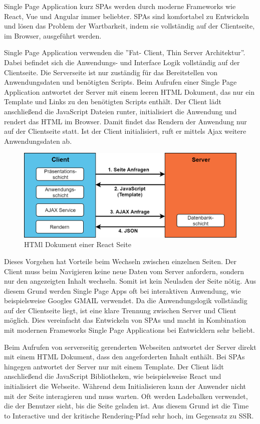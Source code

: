 \documentclass[runningheads]{llncs}
\begin{document}
Single Page Application kurz SPAs werden durch moderne Frameworks wie React, 
Vue und Angular immer beliebter. SPAs sind komfortabel zu Entwickeln 
und lösen das Problem der Wartbarkeit, 
indem sie vollständig auf der Clientseite, 
im Browser, ausgeführt werden.

Single Page Application verwenden die ”Fat- Client, Thin Server Architektur”. 
Dabei befindet sich die Anwendungs- und Interface Logik vollständig auf der Clientseite. 
Die Serverseite ist nur zuständig für das Bereitstellen von Anwendungsdaten 
und benötigten Scripts. 
Beim Aufrufen einer Single Page Application antwortet der Server 
mit einem leeren HTML Dokument, das nur ein Template und Links 
zu den benötigten Scripts enthält. 
Der Client lädt anschließend die JavaScript Dateien runter, 
initialisiert die Anwendung und rendert das HTML im Browser. 
Damit findet das Rendern der Anwendung nur auf der Clientseite statt. 
Ist der Client initialisiert, ruft er mittels Ajax weitere Anwendungsdaten ab.

\begin{figure}[h]
  \centering
  \includegraphics[width=12cm]{images/client}
  \caption{HTMl Dokument einer React Seite}
\end{figure}

Dieses Vorgehen hat Vorteile beim Wechseln zwischen einzelnen Seiten. 
Der Client muss beim Navigieren keine neue Daten vom Server anfordern, 
sondern nur den angezeigten Inhalt wechseln. 
Somit ist kein Neuladen der Seite nötig. 
Aus diesem Grund werden Single Page Apps oft bei interaktiven Anwendung, 
wie beispielsweise Googles GMAIL verwendet. 
Da die Anwendungslogik vollständig auf der Clientseite liegt, 
ist eine klare Trennung zwischen Server und Client möglich. 
Dies vereinfacht das Entwickeln von SPAs und
macht in Kombination mit modernen Frameworks 
Single Page Applications bei Entwicklern sehr beliebt.

Beim Aufrufen von serverseitig gerenderten Webseiten antwortet
der Server direkt mit einem HTML Dokument, 
dass den angeforderten Inhalt enthält. 
Bei SPAs hingegen antwortet der Server nur mit einem Template. 
Der Client lädt anschließend die JavaScript Bibliotheken, 
wie beispielsweise React und initialisiert die Webseite. 
Während dem Initialisieren kann der Anwender nicht mit der Seite interagieren
und muss warten. Oft werden Ladebalken verwendet, 
die der Benutzer sieht, bis die Seite geladen ist. 
Aus diesem Grund ist die Time to Interactive und 
der kritische Rendering-Pfad sehr hoch, im Gegensatz zu SSR.
\end{document}
